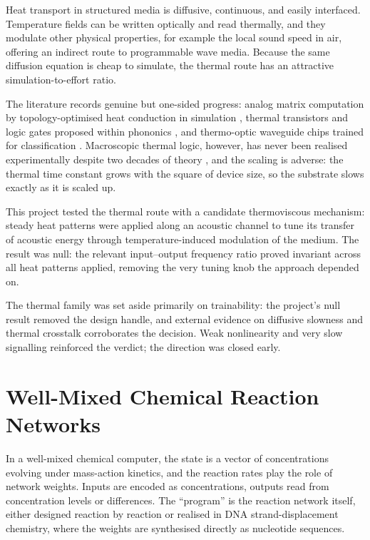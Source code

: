 Heat transport in structured media is diffusive, continuous, and easily interfaced. Temperature fields can be written optically and read thermally, and they modulate other physical properties, for example the local sound speed in air, offering an indirect route to programmable wave media. Because the same diffusion equation is cheap to simulate, the thermal route has an attractive simulation-to-effort ratio.

The literature records genuine but one-sided progress: analog matrix computation by topology-optimised heat conduction in simulation \cite{silva2026thermal}, thermal transistors and logic gates proposed within phononics \cite{li2012colloquium}, and thermo-optic waveguide chips trained for classification \cite{shen2017deep}. Macroscopic thermal logic, however, has never been realised experimentally despite two decades of theory \cite{li2012colloquium}, and the scaling is adverse: the thermal time constant grows with the square of device size, so the substrate slows exactly as it is scaled up.

This project tested the thermal route with a candidate thermoviscous mechanism: steady heat patterns were applied along an acoustic channel to tune its transfer of acoustic energy through temperature-induced modulation of the medium. The result was null: the relevant input--output frequency ratio proved invariant across all heat patterns applied, removing the very tuning knob the approach depended on.

The thermal family was set aside primarily on trainability: the project's null result removed the design handle, and external evidence on diffusive slowness and thermal crosstalk corroborates the decision. Weak nonlinearity and very slow signalling reinforced the verdict; the direction was closed early.

\section{Well-Mixed Chemical Reaction Networks}
\label{sec:sub_crn}

In a well-mixed chemical computer, the state is a vector of concentrations evolving under mass-action kinetics, and the reaction rates play the role of network weights. Inputs are encoded as concentrations, outputs read from concentration levels or differences. The ``program'' is the reaction network itself, either designed reaction by reaction or realised in DNA strand-displacement chemistry, where the weights are synthesised directly as nucleotide sequences.

